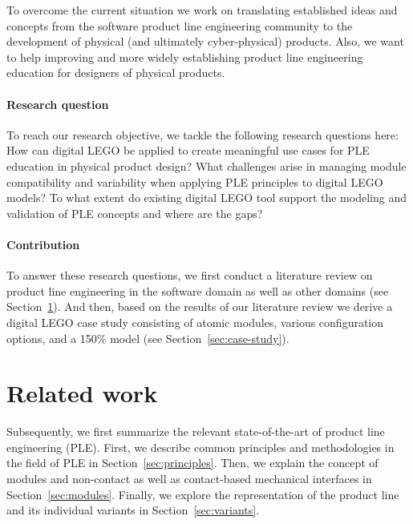 \documentclass[sigconf,review]{acmart}
\begin{document}
To overcome the current situation we work on translating established ideas and concepts from the software product line engineering community to the development of physical (and ultimately cyber-physical) products.
Also, we want to help improving and more widely establishing product line engineering education for designers of physical products.

\paragraph{Research question}

To reach our research objective, we tackle the following research questions here:
How can digital LEGO be applied to create meaningful use cases for PLE education in physical product design?
What challenges arise in managing module compatibility and variability when applying PLE principles to digital LEGO models?
To what extent do existing digital LEGO tool support the modeling and validation of PLE concepts and where are the gaps?

\paragraph{Contribution}

To answer these research questions, we first conduct a literature review on product line engineering in the software domain as well as other domains (see Section~\ref{sec:related-work}).
And then, based on the results of our literature review we derive a digital LEGO case study consisting of atomic modules, various configuration options, and a 150\% model (see Section~\ref{sec:case-study}).

\section{Related work}
\label{sec:related-work}

Subsequently, we first summarize the relevant state-of-the-art of product line engineering (PLE).
First, we describe common principles and methodologies in the field of PLE in Section~\ref{sec:principles}.
Then, we explain the concept of modules and non-contact as well as contact-based mechanical interfaces in Section~\ref{sec:modules}.
Finally, we explore the representation of the product line and its individual variants in Section~\ref{sec:variants}.
\end{document}
